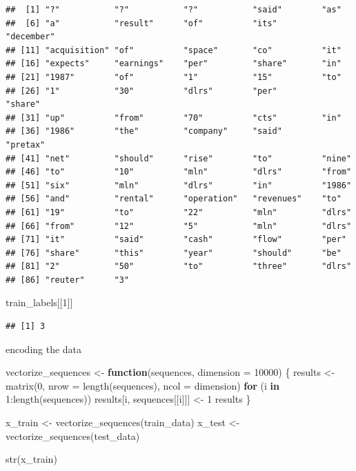 \documentclass[]{article}
\newenvironment{Shaded}{\begin{snugshade}}{\end{snugshade}}
\newcommand{\AttributeTok}[1]{\textcolor[rgb]{0.77,0.63,0.00}{#1}}
\newcommand{\ControlFlowTok}[1]{\textcolor[rgb]{0.13,0.29,0.53}{\textbf{#1}}}
\newcommand{\DecValTok}[1]{\textcolor[rgb]{0.00,0.00,0.81}{#1}}
\newcommand{\FunctionTok}[1]{\textcolor[rgb]{0.00,0.00,0.00}{#1}}
\newcommand{\NormalTok}[1]{#1}
\newcommand{\OtherTok}[1]{\textcolor[rgb]{0.56,0.35,0.01}{#1}}
\newcommand{\SpecialCharTok}[1]{\textcolor[rgb]{0.00,0.00,0.00}{#1}}
\begin{document}
\begin{verbatim}
##  [1] "?"           "?"           "?"           "said"        "as"         
##  [6] "a"           "result"      "of"          "its"         "december"   
## [11] "acquisition" "of"          "space"       "co"          "it"         
## [16] "expects"     "earnings"    "per"         "share"       "in"         
## [21] "1987"        "of"          "1"           "15"          "to"         
## [26] "1"           "30"          "dlrs"        "per"         "share"      
## [31] "up"          "from"        "70"          "cts"         "in"         
## [36] "1986"        "the"         "company"     "said"        "pretax"     
## [41] "net"         "should"      "rise"        "to"          "nine"       
## [46] "to"          "10"          "mln"         "dlrs"        "from"       
## [51] "six"         "mln"         "dlrs"        "in"          "1986"       
## [56] "and"         "rental"      "operation"   "revenues"    "to"         
## [61] "19"          "to"          "22"          "mln"         "dlrs"       
## [66] "from"        "12"          "5"           "mln"         "dlrs"       
## [71] "it"          "said"        "cash"        "flow"        "per"        
## [76] "share"       "this"        "year"        "should"      "be"         
## [81] "2"           "50"          "to"          "three"       "dlrs"       
## [86] "reuter"      "3"
\end{verbatim}

\begin{Shaded}
\begin{Highlighting}[]
\NormalTok{train\_labels[[}\DecValTok{1}\NormalTok{]]}
\end{Highlighting}
\end{Shaded}

\begin{verbatim}
## [1] 3
\end{verbatim}

encoding the data

\begin{Shaded}
\begin{Highlighting}[]
\NormalTok{vectorize\_sequences }\OtherTok{\textless{}{-}} \ControlFlowTok{function}\NormalTok{(sequences, }\AttributeTok{dimension =} \DecValTok{10000}\NormalTok{) \{ }
\NormalTok{  results }\OtherTok{\textless{}{-}} \FunctionTok{matrix}\NormalTok{(}\DecValTok{0}\NormalTok{, }\AttributeTok{nrow =} \FunctionTok{length}\NormalTok{(sequences), }\AttributeTok{ncol =}\NormalTok{ dimension) }
  \ControlFlowTok{for}\NormalTok{ (i }\ControlFlowTok{in} \DecValTok{1}\SpecialCharTok{:}\FunctionTok{length}\NormalTok{(sequences))}
\NormalTok{    results[i, sequences[[i]]] }\OtherTok{\textless{}{-}} \DecValTok{1} 
\NormalTok{  results}
\NormalTok{\}}

\NormalTok{x\_train }\OtherTok{\textless{}{-}} \FunctionTok{vectorize\_sequences}\NormalTok{(train\_data) }
\NormalTok{x\_test }\OtherTok{\textless{}{-}} \FunctionTok{vectorize\_sequences}\NormalTok{(test\_data)}

\FunctionTok{str}\NormalTok{(x\_train)}
\end{Highlighting}
\end{Shaded}
\end{document}
